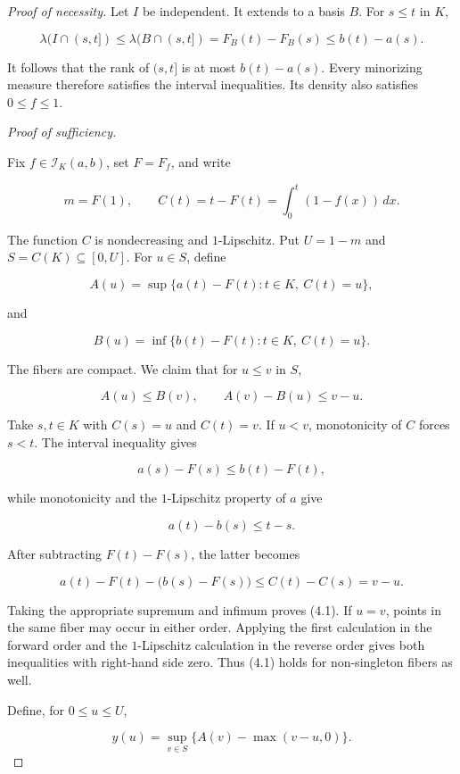 \documentclass[11pt]{article}
\numberwithin{equation}{section}
\begin{document}
\begin{proof}[Proof of necessity]

Let $I$ be independent. It extends to a basis $B$. For $s\le t$ in $K$,

\nopagebreak[4]
\[
\lambda(I\cap(s,t])
\le\lambda(B\cap(s,t])
=F_B(t)-F_B(s)
\le b(t)-a(s).
\]

It follows that the rank of $(s,t]$ is at most $b(t)-a(s)$. Every minorizing measure
therefore satisfies the interval inequalities. Its density also satisfies $0\le f\le1$.

\medskip
\noindent\emph{Proof of sufficiency.}


Fix $f\in\mathcal I_K(a,b)$, set $F=F_f$, and write

\nopagebreak[4]
\[
m=F(1),\qquad C(t)=t-F(t)=\int_0^t(1-f(x))\,dx.
\]

The function $C$ is nondecreasing and $1$-Lipschitz. Put $U=1-m$ and
$S=C(K)\subseteq[0,U]$. For $u\in S$, define

\nopagebreak[4]
\[
A(u)=\sup\{a(t)-F(t):t\in K,\ C(t)=u\},
\]

and

\nopagebreak[4]
\[
B(u)=\inf\{b(t)-F(t):t\in K,\ C(t)=u\}.
\]

The fibers are compact. We claim that for $u\le v$ in $S$,

\nopagebreak[4]
\[
A(u)\le B(v),\qquad A(v)-B(u)\le v-u. \tag{4.1}
\]

Take $s,t\in K$ with $C(s)=u$ and $C(t)=v$. If $u<v$, monotonicity of $C$ forces
$s<t$. The interval inequality gives

\nopagebreak[4]
\[
a(s)-F(s)\le b(t)-F(t),
\]

while monotonicity and the $1$-Lipschitz property of $a$ give

\nopagebreak[4]
\[
a(t)-b(s)\le t-s.
\]

After subtracting $F(t)-F(s)$, the latter becomes

\nopagebreak[4]
\[
a(t)-F(t)-\bigl(b(s)-F(s)\bigr)
\le C(t)-C(s)=v-u.
\]

Taking the appropriate supremum and infimum proves (4.1). If $u=v$, points in the same
fiber may occur in either order. Applying the first calculation in the forward order
and the $1$-Lipschitz calculation in the reverse order gives both inequalities with
right-hand side zero. Thus (4.1) holds for non-singleton fibers as well.

Define, for $0\le u\le U$,

\nopagebreak[4]
\[
y(u)=\sup_{v\in S}\{A(v)-\max(v-u,0)\}. \tag{4.2}
\]


\end{proof}
\end{document}
